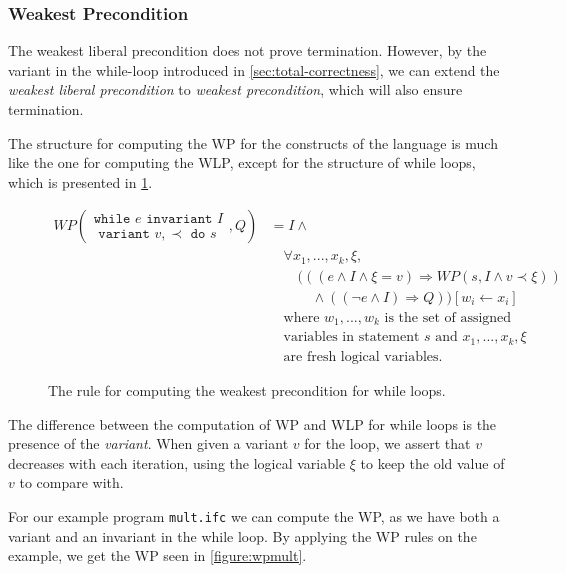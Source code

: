 \subsubsection{Weakest Precondition}
The weakest liberal precondition does not prove termination. However, by the variant in the while-loop introduced in \cref{sec:total-correctness}, we can extend the \textit{weakest liberal precondition} to \textit{weakest precondition}, which will also ensure termination.

The structure for computing the WP for the constructs of the language is much like the one for computing the WLP, except for the structure of while loops, which is presented in \cref{fig:wp}.

\begin{figure}[h!]
\begin{align*}
WP\left(
    \begin{array}{c}
    \texttt{while } e \texttt{ invariant } I \\
    \texttt{ variant } v, \prec \texttt{ do } s
    \end{array}
, Q \right) 
&= 
    I \land \label{eq:wpwhile} \\
&\quad \forall x_1, ..., x_k, \xi, \\
&\quad \quad (((e \land I \land \xi = v) \Rightarrow WP(s, I \land v \prec \xi)) \\
&\quad \quad \quad \land ((\neg e \land I) \Rightarrow Q)) [w_i \leftarrow x_i] \\
&\quad \text{where } w_1, ..., w_k \text{ is the set of assigned} \\
&\quad \text{variables in statement } s \text{ and } x_1, ..., x_k, \xi \\
&\quad \text{are fresh logical variables.}
\end{align*}
\caption{The rule for computing the weakest precondition for while loops.}
\label{fig:wp}
\end{figure}

The difference between the computation of WP and WLP for while loops is the presence of the \textit{variant}.
When given a variant $v$ for the loop, we assert that $v$ decreases with each iteration, using the logical variable $\xi$ to keep the old value of $v$ to compare with.

For our example program \texttt{mult.ifc} we can compute the WP, as we have both a variant and an invariant in the while loop.
By applying the WP rules on the example, we get the WP seen in \cref{figure:wpmult}.

